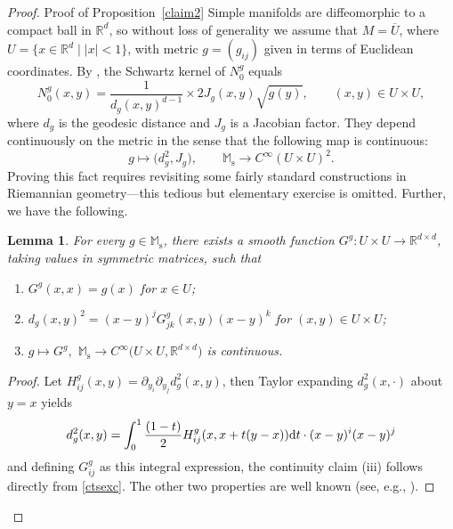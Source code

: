 \documentclass[10pt,a4paper]{amsart}
\numberwithin{equation}{section}
\newtheorem{Lemma}[Theorem]{Lemma}
\theoremstyle{definition}
\newcommand{\R}{\mathbb{R}} %
\newcommand{\M}{\mathbb{M}}
\newcommand{\Ms}{\M_{\mathrm{s}}}
\newcommand{\1}{{\bf 1}}
\begin{document}
\begin{proof}{Proof of Proposition~\ref{claim2}} Simple manifolds are diffeomorphic to a compact ball in $\R^d$, so without loss of generality we assume that $M=\overline U$, where $U=\big\{x\in \R^d \mid |x|<1\big\}$, with metric $g=(g_{ij})$ given in terms of Euclidean coordinates. By \cite[Lemma~8.1.10]{PSU23}, the Schwartz kernel of $N^g_0$ equals
\[
	N^g_0(x,y) = \frac{1}{d_g(x,y)^{d-1}} \times 2 J_g(x,y) \sqrt{g(y)},\qquad (x,y)\in U\times U,
\]
where $d_g$ is the geodesic distance and $J_g$ is a Jacobian factor. They depend continuously on the metric in the sense that the following map is continuous:
\begin{equation}\label{ctsexc}
	g\mapsto \bigl(d_g^2,J_g\bigr), \qquad \Ms\rightarrow C^\infty(U\times U)^2.
\end{equation}
Proving this fact requires revisiting some fairly standard constructions in Riemannian ge\-ome\-try---this tedious but elementary exercise is omitted. Further, we have the following.
\begin{Lemma}
	For every $g\in \Ms$, there exists a smooth function $G^g\colon U\times U\rightarrow \R^{d\times d}$, taking values in symmetric matrices, such that
	\begin{enumerate}[label=\rm(\roman*)]\itemsep=0pt
		\item $G^g(x,x)=g(x)$ for $x\in U$;
		\item $d_g(x,y)^2=(x-y)^jG^g_{jk}(x,y) (x-y)^k$ for $(x,y)\in U\times U$;
		\item $g\mapsto G^g,$ $\Ms\rightarrow C^\infty\bigl(U\times U, \R^{d\times d}\bigr)$ is continuous.
	\end{enumerate}
\end{Lemma}
\begin{proof}
	Let $H_{ij}^g(x,y)=\partial_{y_i}\partial_{y_j} d^2_g(x,y)$, then Taylor expanding $d_g^2(x,\cdot)$ about $y=x$ yields
	\[
		d_g^2(x,y)= \int_{0}^1 \frac{(1-t)}{2} H^g_{ij}(x,x+t(y-x)){\rm d}t\cdot (x-y)^i(x-y)^j
	\]
	and defining $G^g_{ij}$ as this integral expression, the continuity claim (iii) follows directly from \eqref{ctsexc}. The other two properties are well known (see, e.g., \cite[Lemma 8.1.12]{PSU23}).
\end{proof}








\end{proof}
\end{document}

